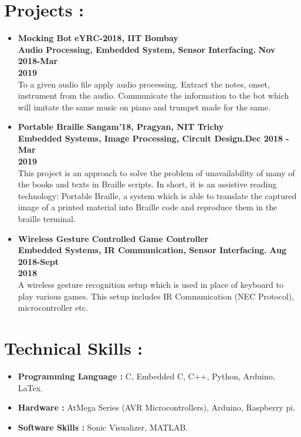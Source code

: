 \documentclass[a4paper, 12 pt]{article}
\begin{document}
\section*{Projects :}
\begin{itemize}
\item {\Large \textbf{Mocking Bot}}{ \hfill {\bf eYRC-2018, IIT Bombay}}\\
{\bf Audio Processing, Embedded System, Sensor Interfacing.} \hfill{\bf Nov 2018-Mar} \\ \hfill {\bf 2019}\\
To a given audio file apply audio processing. Extract the notes, onset, instrument from the audio. Communicate the information to the bot which will imitate the same music on piano and trumpet made for the same.
\item {\Large \textbf{Portable Braille}}{ \hfill {\bf Sangam'18, Pragyan, NIT Trichy}}\\
{\bf Embedded Systems, Image Processing, Circuit Design.}\hfill{\bf Dec 2018 - Mar} \\ \hfill {\bf 2019}\\
This project is an approach to solve the problem of unavailability of many of the books and texts in Braille scripts. In short, it is an assistive reading technology: Portable Braille, a system which is able to translate the captured image of a printed material into Braille code and reproduce them in the braille terminal.\\
\item {\Large \textbf{Wireless Gesture Controlled Game Controller }}\\
{\bf Embedded Systems, IR Communication, Sensor Interfacing.} \hfill {\bf Aug 2018-Sept}\\ \hfill {\bf 2018}\\
A wireless gesture recognition setup which is used in place of keyboard to play various games. This setup includes IR Communication (NEC Protocol), microcontroller etc.
\end{itemize}
\section*{Technical Skills :}
\begin{itemize}
\item {\large {\bf Programming Language :}} C, Embedded C, C++, Python, Arduino, LaTex.
\item {\large {\bf Hardware :}} AtMega Series (AVR Microcontrollers), Arduino, Raspberry pi.
\item {\large {\bf Software Skills :}} Sonic Visualizer, MATLAB.
\end{itemize}
\end{document}
